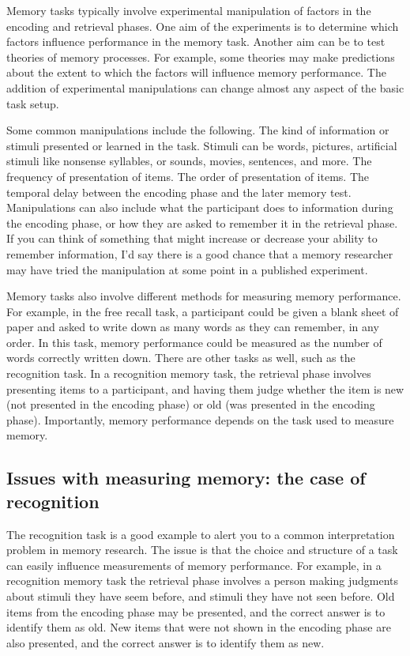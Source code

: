 \documentclass[
  oneside,
  12pt]{crumpbook}
\begin{document}
Memory tasks typically involve experimental manipulation of factors in the encoding and retrieval phases. One aim of the experiments is to determine which factors influence performance in the memory task. Another aim can be to test theories of memory processes. For example, some theories may make predictions about the extent to which the factors will influence memory performance. The addition of experimental manipulations can change almost any aspect of the basic task setup.

Some common manipulations include the following. The kind of information or stimuli presented or learned in the task. Stimuli can be words, pictures, artificial stimuli like nonsense syllables, or sounds, movies, sentences, and more. The frequency of presentation of items. The order of presentation of items. The temporal delay between the encoding phase and the later memory test. Manipulations can also include what the participant does to information during the encoding phase, or how they are asked to remember it in the retrieval phase. If you can think of something that might increase or decrease your ability to remember information, I'd say there is a good chance that a memory researcher may have tried the manipulation at some point in a published experiment.

Memory tasks also involve different methods for measuring memory performance. For example, in the free recall task, a participant could be given a blank sheet of paper and asked to write down as many words as they can remember, in any order. In this task, memory performance could be measured as the number of words correctly written down. There are other tasks as well, such as the recognition task. In a recognition memory task, the retrieval phase involves presenting items to a participant, and having them judge whether the item is new (not presented in the encoding phase) or old (was presented in the encoding phase). Importantly, memory performance depends on the task used to measure memory.

\hypertarget{issues-with-measuring-memory-the-case-of-recognition}{%
\subsection{Issues with measuring memory: the case of recognition}\label{issues-with-measuring-memory-the-case-of-recognition}}

The recognition task is a good example to alert you to a common interpretation problem in memory research. The issue is that the choice and structure of a task can easily influence measurements of memory performance. For example, in a recognition memory task the retrieval phase involves a person making judgments about stimuli they have seem before, and stimuli they have not seen before. Old items from the encoding phase may be presented, and the correct answer is to identify them as old. New items that were not shown in the encoding phase are also presented, and the correct answer is to identify them as new.
\end{document}
